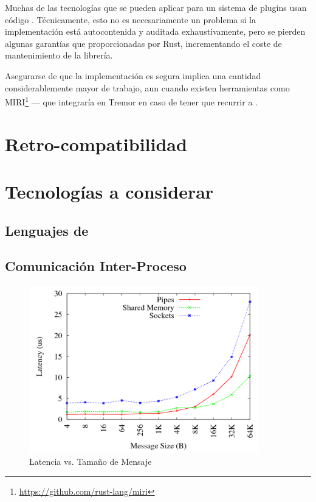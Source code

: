 Muchas de las tecnologías que se pueden aplicar para un sistema de plugins usan
código \unsafe. Técnicamente, esto no es necesariamente un problema si la
implementación está autocontenida y auditada exhaustivamente, pero se pierden
algunas garantías que proporcionadas por Rust, incrementando el coste de
mantenimiento de la librería.

Asegurarse de que la implementación es segura implica una cantidad
considerablemente mayor de trabajo, aun cuando existen herramientas como
MIRI\footnote{\url{https://github.com/rust-lang/miri}} --- que integraría en
Tremor en caso de tener que recurrir a \unsafe.

\section{Retro-compatibilidad}\label{sec:compat}

\section{Tecnologías a considerar}

\subsection{Lenguajes de \scripting}

\subsection{Comunicación Inter-Proceso}

\begin{figure}
    \centering
    \includegraphics[width=10cm]{./Imagenes/venkataraman2015evaluation1.png}
    \caption{Latencia vs. Tamaño de Mensaje \cite{venkataraman2015evaluation}}%
    \label{fig:ipc_comparison1}
\end{figure}

